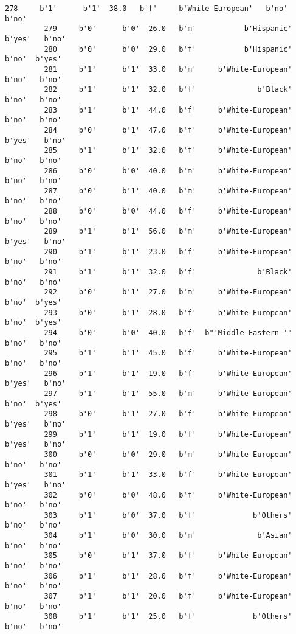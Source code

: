 \documentclass[11pt]{article}
\begin{document}
\begin{Verbatim}[commandchars=\\\{\}]
         278     b'1'      b'1'  38.0   b'f'     b'White-European'   b'no'   b'no'   
         279     b'0'      b'0'  26.0   b'm'           b'Hispanic'  b'yes'   b'no'   
         280     b'0'      b'0'  29.0   b'f'           b'Hispanic'   b'no'  b'yes'   
         281     b'1'      b'1'  33.0   b'm'     b'White-European'   b'no'   b'no'   
         282     b'1'      b'1'  32.0   b'f'              b'Black'   b'no'   b'no'   
         283     b'1'      b'1'  44.0   b'f'     b'White-European'   b'no'   b'no'   
         284     b'0'      b'1'  47.0   b'f'     b'White-European'  b'yes'   b'no'   
         285     b'1'      b'1'  32.0   b'f'     b'White-European'   b'no'   b'no'   
         286     b'0'      b'0'  40.0   b'm'     b'White-European'   b'no'   b'no'   
         287     b'0'      b'1'  40.0   b'm'     b'White-European'   b'no'   b'no'   
         288     b'0'      b'0'  44.0   b'f'     b'White-European'   b'no'   b'no'   
         289     b'1'      b'1'  56.0   b'm'     b'White-European'  b'yes'   b'no'   
         290     b'1'      b'1'  23.0   b'f'     b'White-European'   b'no'   b'no'   
         291     b'1'      b'1'  32.0   b'f'              b'Black'   b'no'   b'no'   
         292     b'0'      b'1'  27.0   b'm'     b'White-European'   b'no'  b'yes'   
         293     b'0'      b'1'  28.0   b'f'     b'White-European'   b'no'  b'yes'   
         294     b'0'      b'0'  40.0   b'f'  b"'Middle Eastern '"   b'no'   b'no'   
         295     b'1'      b'1'  45.0   b'f'     b'White-European'   b'no'   b'no'   
         296     b'1'      b'1'  19.0   b'f'     b'White-European'  b'yes'   b'no'   
         297     b'1'      b'1'  55.0   b'm'     b'White-European'   b'no'  b'yes'   
         298     b'0'      b'1'  27.0   b'f'     b'White-European'  b'yes'   b'no'   
         299     b'1'      b'1'  19.0   b'f'     b'White-European'  b'yes'   b'no'   
         300     b'0'      b'0'  29.0   b'm'     b'White-European'   b'no'   b'no'   
         301     b'1'      b'1'  33.0   b'f'     b'White-European'  b'yes'   b'no'   
         302     b'0'      b'0'  48.0   b'f'     b'White-European'   b'no'   b'no'   
         303     b'1'      b'0'  37.0   b'f'             b'Others'   b'no'   b'no'   
         304     b'1'      b'0'  30.0   b'm'              b'Asian'   b'no'   b'no'   
         305     b'0'      b'1'  37.0   b'f'     b'White-European'   b'no'   b'no'   
         306     b'1'      b'1'  28.0   b'f'     b'White-European'   b'no'   b'no'   
         307     b'1'      b'1'  20.0   b'f'     b'White-European'   b'no'   b'no'   
         308     b'1'      b'1'  25.0   b'f'             b'Others'   b'no'   b'no'   

\end{Verbatim}
\end{document}

